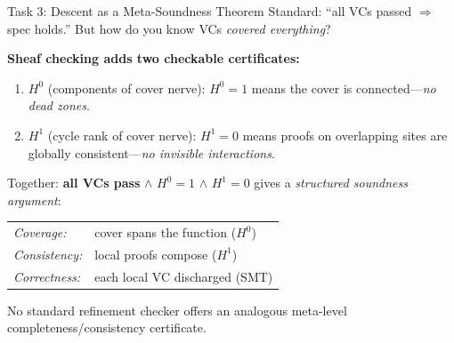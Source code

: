 \documentclass[aspectratio=169,10pt]{beamer}
\begin{document}
\begin{frame}{Task 3: Descent as a Meta-Soundness Theorem}
Standard: ``all VCs passed $\Rightarrow$ spec holds.''
But how do you know VCs \emph{covered everything}?

\vspace{0.4em}
\textbf{Sheaf checking adds two checkable certificates:}
\begin{enumerate}\small
  \item $H^0$ (components of cover nerve):
        $H^0\!=\!1$ means the cover is connected---\emph{no dead zones}.
  \item $H^1$ (cycle rank of cover nerve):
        $H^1\!=\!0$ means proofs on overlapping sites are globally
        consistent---\emph{no invisible interactions}.
\end{enumerate}

\vspace{0.3em}
Together: \textbf{all VCs pass} $\land$ $H^0\!=\!1$ $\land$ $H^1\!=\!0$
gives a \emph{structured soundness argument}:

\vspace{0.2em}
\begin{tabular}{@{}ll@{}}
\emph{Coverage:}    & cover spans the function ($H^0$) \\
\emph{Consistency:} & local proofs compose ($H^1$) \\
\emph{Correctness:} & each local VC discharged (SMT) \\
\end{tabular}

\vspace{0.4em}
No standard refinement checker offers an analogous
meta-level completeness/consistency certificate.
\end{frame}
\end{document}
